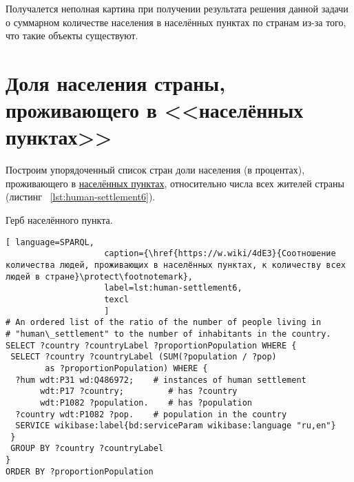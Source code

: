 Получалется неполная картина при получении результата решения данной задачи о суммарном количестве населения в населённых пунктах по странам из-за того, что такие объекты существуют.

\section{Доля населения страны, проживающего в <<населённых пунктах>>}

Построим упорядоченный список стран доли населения (в процентах), проживающего в \href{http://www.wikidata.org/entity/Q486972}{населённых пунктах}, относительно числа всех жителей страны (листинг ~\protect\ref{lst:human-settlement6}).

\begin{marginfigure}[0.0cm]
{
\setlength{\fboxsep}{0pt}%
\setlength{\fboxrule}{1pt}%
%
}
  \caption{Герб населённого пункта.}%
  \label{fig:flag_question_human_settlements3}%
\end{marginfigure}


\begin{lstlisting}[ language=SPARQL, 
                    caption={\href{https://w.wiki/4dE3}{Соотношение количества людей, проживающих в населённых пунктах, к количеству всех людей в стране}\protect\footnotemark},
                    label=lst:human-settlement6,
                    texcl 
                    ]
# An ordered list of the ratio of the number of people living in 
# "human\_settlement" to the number of inhabitants in the country.
SELECT ?country ?countryLabel ?proportionPopulation WHERE {
 SELECT ?country ?countryLabel (SUM(?population / ?pop) 
        as ?proportionPopulation) WHERE {
  ?hum wdt:P31 wd:Q486972;    # instances of human settlement  
       wdt:P17 ?country;         # has ?country 
       wdt:P1082 ?population.    # has ?population
  ?country wdt:P1082 ?pop.    # population in the country
  SERVICE wikibase:label{bd:serviceParam wikibase:language "ru,en"}
 }
 GROUP BY ?country ?countryLabel
}
ORDER BY ?proportionPopulation
\end{lstlisting}%

